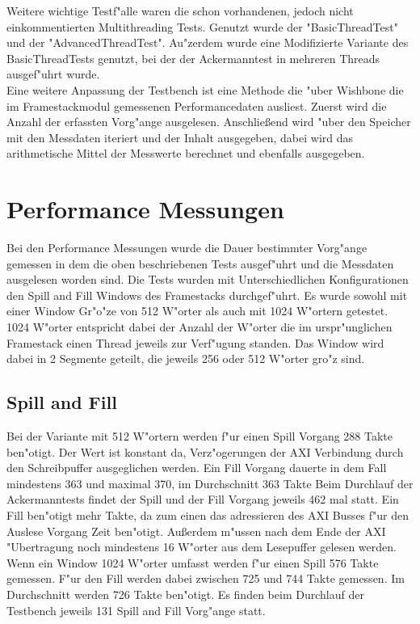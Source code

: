 			
Weitere wichtige Testf"alle waren die schon vorhandenen, jedoch nicht einkommentierten Multithreading Tests. Genutzt wurde der "BasicThreadTest" und der "AdvancedThreadTest". Au"zerdem wurde eine Modifizierte Variante des BasicThreadTests genutzt, bei der der Ackermanntest in mehreren Threads ausgef"uhrt wurde. \\

Eine weitere Anpassung der Testbench ist eine Methode die "uber Wishbone die im Framestackmodul gemessenen Performancedaten ausliest.  Zuerst wird die Anzahl der erfassten Vorg"ange ausgelesen. Anschließend wird "uber den Speicher mit den Messdaten iteriert und der Inhalt ausgegeben, dabei wird das arithmetische Mittel der Messwerte berechnet und ebenfalls ausgegeben. 


\section{Performance Messungen}
Bei den Performance Messungen wurde die Dauer bestimmter Vorg"ange gemessen in dem die oben beschriebenen Tests ausgef"uhrt und die Messdaten ausgelesen worden sind. 
Die Tests wurden mit Unterschiedlichen Konfigurationen den Spill and Fill Windows des Framestacks durchgef"uhrt. Es wurde sowohl mit einer Window Gr"o"ze von 512 W"orter als auch mit 1024 W"ortern getestet. 1024 W"orter entspricht dabei der Anzahl der W"orter die im urspr"unglichen Framestack einen Thread jeweils zur Verf"ugung standen. Das Window wird dabei in 2 Segmente geteilt, die jeweils 256 oder 512 W"orter gro"z sind.

\subsection{Spill and Fill}

Bei der Variante mit 512 W"ortern werden f"ur einen Spill Vorgang 288 Takte ben"otigt. Der Wert ist konstant da, Verz"ogerungen der AXI Verbindung durch den Schreibpuffer ausgeglichen werden. Ein Fill Vorgang dauerte in dem Fall mindestens 363 und maximal 370, im Durchschnitt 363 Takte 
Beim Durchlauf der Ackermanntests findet der Spill und der Fill Vorgang jeweils 462 mal statt. 
Ein Fill ben"otigt mehr Takte, da zum einen das adressieren des AXI Busses f"ur den Auslese Vorgang Zeit ben"otigt. Außerdem m"ussen nach dem Ende der AXI "Ubertragung noch mindestens 16 W"orter aus dem Lesepuffer gelesen werden.  
Wenn ein Window 1024 W"orter umfasst werden f"ur einen Spill 576 Takte gemessen. F"ur den Fill werden dabei zwischen 725 und 744 Takte gemessen. Im Durchschnitt werden 726 Takte ben"otigt. 
Es finden beim Durchlauf der Testbench jeweils 131 Spill and Fill Vorg"ange statt. 
